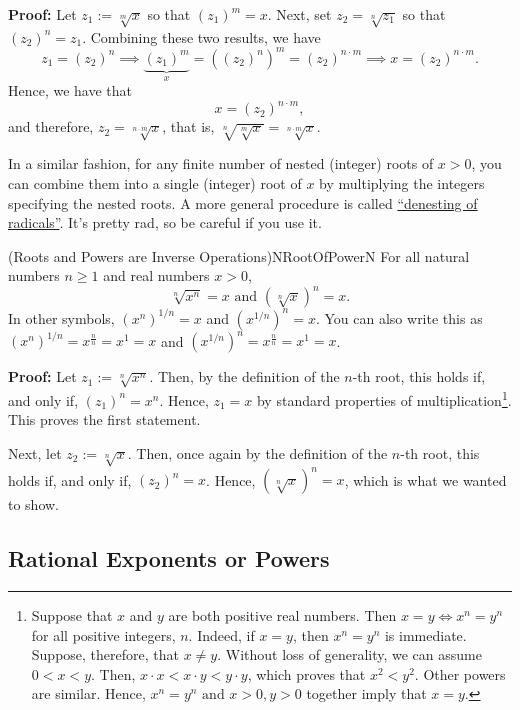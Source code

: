 \textbf{Proof:} Let $z_1:= \sqrt[m]{x}$ so that $(z_1)^m = x$. Next, set $z_2 = \sqrt[n]{z_1}$ so that $(z_2)^n = z_1$. Combining these two results, we have 
$$ z_1 = (z_2)^n \implies \underbrace{(z_1)^m}_{x} = \left( (z_2)^n \right)^m = (z_2)^{n \cdot m} \implies x =(z_2)^{n \cdot m}.$$
Hence, we have that 
$$ x = (z_2)^{n \cdot m},$$
and therefore, $z_2 = \sqrt[n \cdot m]{x}$, that is, $\sqrt[n]{ \sqrt[m]{x  }  } = \sqrt[n\cdot m]{  x}$. 
\Qed

\bigskip

In a similar fashion, for any finite number of nested (integer) roots of $x>0$, you can combine them into a single (integer) root of $x$ by multiplying the integers specifying the nested roots. A more general procedure is called \href{https://en.wikipedia.org/wiki/Nested_radical}{``denesting of radicals''}. It's pretty rad, so be careful if you use it.

\bigskip
\begin{propColor}{(Roots and Powers are Inverse Operations)}{NRootOfPowerN} For all natural numbers $n\ge 1$ and real numbers $x>0$,
     $$\sqrt[n]{x^n } = x \text{ and } \left(\sqrt[n]{x} \right)^n = x.$$
     In other symbols, $\left( x^{n} \right)^{1/n} =x$ and $\left( x^{1/n} \right)^n =x$. You can also write this as $\left( x^{n} \right)^{1/n}= x^{\frac{n}{n}}=x^1 = x $ and $\left( x^{1/n} \right)^n = x^{\frac{n}{n}}=x^1 = x $. 
\end{propColor}

\textbf{Proof:} Let $z_1:= \sqrt[n]{x^n }$. Then, by the definition of the $n$-th root, this holds if, and only if, $(z_1)^n = x^n$. Hence, $z_1 = x$ by standard properties of multiplication\footnote{Suppose that $x$ and $y$ are both positive real numbers. Then $x = y \iff x^n = y^n$ for all positive integers, $n$. Indeed, if $x=y$, then $x^n=y^n$ is immediate. Suppose, therefore, that $x \neq y$. Without loss of generality, we can assume $0 < x < y$. Then, $x \cdot x < x \cdot y < y \cdot y$, which proves that $x^2 < y^2$. Other powers are similar. Hence, $x^n = y^n \text{ and } x>0, y>0$ together imply that $x = y$. }. This proves the first statement.

Next, let $z_2 := \sqrt[n]{x}$. Then, once again by the definition of the $n$-th root, this holds if, and only if, $(z_2)^n = x$. Hence, $\left( \sqrt[n]{x} \right)^n = x$, which is what we wanted to show.
\Qed




\subsection{Rational Exponents or Powers}

